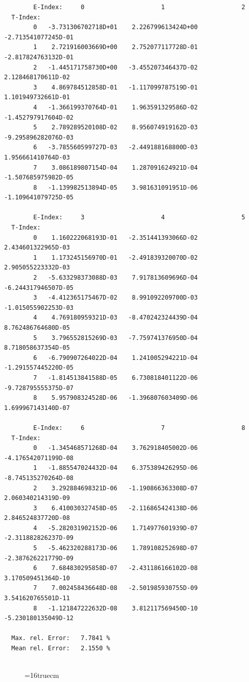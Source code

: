 \documentclass[12pt,dvips]{article}
\begin{document}
\begin{small}\begin{verbatim}
        E-Index:     0                     1                     2
  T-Index:
        0   -3.731306702718D+01    2.226799613424D+00   -2.713541077245D-01
        1    2.721916003669D+00    2.752077117728D-01   -2.817824763132D-01
        2   -1.445171758730D+00   -3.455207346437D-02    2.128468170611D-02
        3    4.869784512858D-01   -1.117099787519D-01    1.101949732661D-01
        4   -1.366199370764D-01    1.963591329586D-02   -1.452797917604D-02
        5    2.789289520108D-02    8.956074919162D-03   -9.295896282076D-03
        6   -3.785560599727D-03   -2.449188168800D-03    1.956661410764D-03
        7    3.086189807154D-04    1.287091624921D-04   -1.507685975982D-05
        8   -1.139982513894D-05    3.981631091951D-06   -1.109641079725D-05

        E-Index:     3                     4                     5
  T-Index:
        0    1.160222068193D-01   -2.351441393066D-02    2.434601322965D-03
        1    1.173245156970D-01   -2.491839320070D-02    2.905055223332D-03
        2   -5.633298373088D-03    7.917813609696D-04   -6.244317946507D-05
        3   -4.412365175467D-02    8.991092209700D-03   -1.015055902253D-03
        4    4.769180959321D-03   -8.470242324439D-04    8.762486764680D-05
        5    3.796552815269D-03   -7.759741376950D-04    8.718058637354D-05
        6   -6.790907264022D-04    1.241005294221D-04   -1.291557445220D-05
        7   -1.814513841588D-05    6.730818401122D-06   -9.728795555375D-07
        8    5.957908324528D-06   -1.396807603409D-06    1.699967143140D-07

        E-Index:     6                     7                     8
  T-Index:
        0   -1.345468571268D-04    3.762918405002D-06   -4.176542071199D-08
        1   -1.885547024432D-04    6.375389426295D-06   -8.745135270264D-08
        2    3.292884698321D-06   -1.190866363308D-07    2.060340214319D-09
        3    6.410030327458D-05   -2.116865424138D-06    2.846524837720D-08
        4   -5.282031902152D-06    1.714977601939D-07   -2.311882826237D-09
        5   -5.462320288173D-06    1.789108252698D-07   -2.387626221779D-09
        6    7.684830295858D-07   -2.431186166102D-08    3.170509451364D-10
        7    7.002458436648D-08   -2.501985930755D-09    3.541620765501D-11
        8   -1.121847222632D-08    3.812117569450D-10   -5.230180135049D-12

  Max. rel. Error:   7.7841 %
  Mean rel. Error:   2.1550 %


\end{verbatim}\end{small}
\begin{figure} \label{2.2.15e}
\epsfxsize=16truecm
\end{figure}
\newpage
\end{document}
